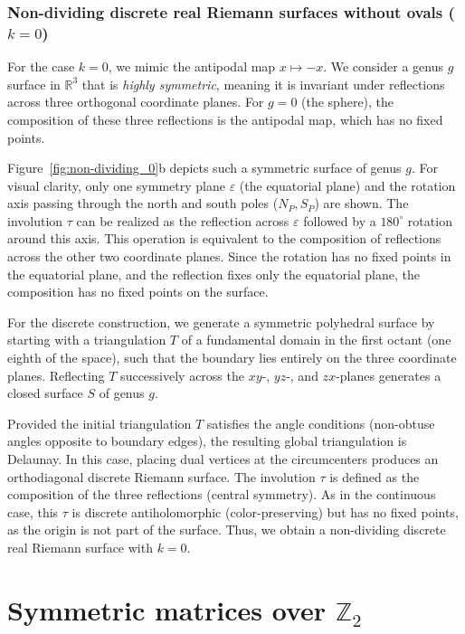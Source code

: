\documentclass[11pt,a4paper]{article}
\theoremstyle{definition}
\begin{document}
\subsubsection*{Non-dividing discrete real Riemann surfaces without ovals ($k=0$)}

For the case $k=0$, we mimic the antipodal map $x \mapsto -x$. We consider a genus $g$ surface in $\mathds{R}^3$ that is \textit{highly symmetric}, meaning it is invariant under reflections across three orthogonal coordinate planes. For $g=0$ (the sphere), the composition of these three reflections is the antipodal map, which has no fixed points.

Figure~\ref{fig:non-dividing_0}b depicts such a symmetric surface of genus $g$. For visual clarity, only one symmetry plane $\varepsilon$ (the equatorial plane) and the rotation axis passing through the north and south poles ($N_P, S_P$) are shown. The involution $\tau$ can be realized as the reflection across $\varepsilon$ followed by a $180^\circ$ rotation around this axis. This operation is equivalent to the composition of reflections across the other two coordinate planes. Since the rotation has no fixed points in the equatorial plane, and the reflection fixes only the equatorial plane, the composition has no fixed points on the surface.

For the discrete construction, we generate a symmetric polyhedral surface by starting with a triangulation $T$ of a fundamental domain in the first octant (one eighth of the space), such that the boundary lies entirely on the three coordinate planes. Reflecting $T$ successively across the $xy$-, $yz$-, and $zx$-planes generates a closed surface $S$ of genus $g$.

Provided the initial triangulation $T$ satisfies the angle conditions (non-obtuse angles opposite to boundary edges), the resulting global triangulation is Delaunay. In this case, placing dual vertices at the circumcenters produces an orthodiagonal discrete Riemann surface.
The involution $\tau$ is defined as the composition of the three reflections (central symmetry). As in the continuous case, this $\tau$ is discrete antiholomorphic (color-preserving) but has no fixed points, as the origin is not part of the surface. Thus, we obtain a non-dividing discrete real Riemann surface with $k=0$.


\appendix
\section{Symmetric matrices over $\mathds{Z}_2$}\label{sec:bilinearforms}
\end{document}

